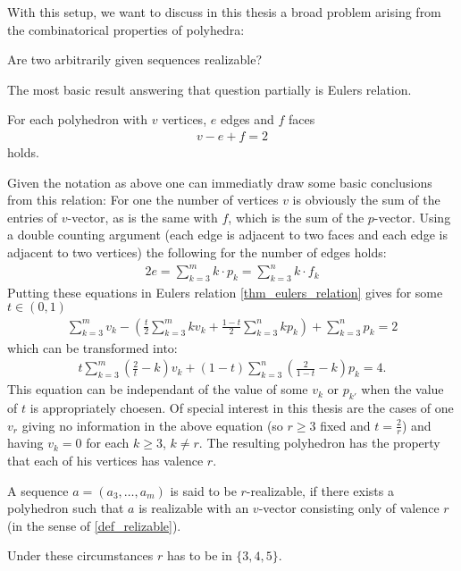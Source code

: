 With this setup, we want to discuss in this thesis a broad problem arising from the combinatorical properties of polyhedra:
\begin{problem} Are two arbitrarily given sequences realizable?
\end{problem}
The most basic result answering that question partially is Eulers relation.
\begin{theorem}\label{thm_eulers_relation}
  For each polyhedron with $v$ vertices, $e$ edges and $f$ faces
  \begin{align*}
    v - e + f = 2
  \end{align*}
  holds.
\end{theorem}
Given the notation as above one can immediatly draw some basic conclusions from this relation: For one the number of vertices $v$ is obviously the sum of the entries of $v$-vector, as is the same with $f$, which is the sum of the $p$-vector. Using a double counting argument (each edge is adjacent to two faces and each edge is adjacent to two vertices) the following for the number of edges holds:
\begin{align*}
  2e = \sum_{k=3}^{m} k \cdot p_k = \sum_{k=3}^{n} k \cdot f_k
\end{align*}
Putting these equations in Eulers relation \autoref{thm_eulers_relation} gives for some $t \in (0, 1)$
\begin{align*}
  \sum_{k=3}^m v_k - \left(\frac{t}{2} \sum_{k=3}^m k v_k + \frac{1-t}{2} \sum_{k=3}^n k p_k \right) + \sum_{k=3}^n p_k = 2
\end{align*}
which can be transformed into:
\begin{align*}
  t \sum_{k=3}^m \left(\frac{2}{t} - k \right) v_k + (1-t) \sum_{k=3}^n \left( \frac{2}{1-t} - k \right) p_k = 4.
\end{align*}
This equation can be independant of the value of some $v_k$ or $p_{k'}$ when the value of $t$ is appropriately choesen. Of special interest in this thesis are the cases of one $v_r$ giving no information in the above equation (so $r \geq 3$ fixed and $t = \frac{2}{r}$) and having $v_{k} = 0$ for each $k \geq 3$, $k \neq r$. The resulting polyhedron has the property that each of his vertices has valence $r$. 
\begin{definition}[$r$-realizable]
  A sequence $a = (a_3, \dots, a_m)$ is said to be $r$-realizable, if there exists a polyhedron such that $a$ is realizable with an $v$-vector consisting only of valence $r$ (in the sense of \autoref{def_relizable}).
\end{definition}
Under these circumstances $r$ has to be in $\{3, 4, 5\}$.

